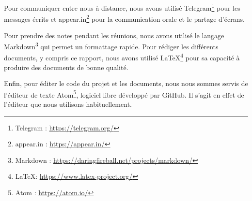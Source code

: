 Pour communiquer entre nous à distance, nous avons utilisé Telegram\footnote{Telegram : \url{https://telegram.org/}} pour les messages écrits et appear.in\footnote{appear.in : \url{https://appear.in/}} pour la communication orale et le partage d'écrans.

Pour prendre des notes pendant les réunions, nous avons utilisé le langage Markdown\footnote{Markdown : \url{https://daringfireball.net/projects/markdown/}} qui permet un formattage rapide. Pour rédiger les différents documents, y compris ce rapport, nous avons utilisé \LaTeX\footnote{\LaTeX : \url{https://www.latex-project.org/}} pour sa capacité à produire des documents de bonne qualité.

Enfin, pour éditer le code du projet et les documents, nous nous sommes servis de l'éditeur de texte Atom\footnote{Atom : \url{https://atom.io/}}, logiciel libre développé par GitHub. Il s'agit en effet de l'éditeur que nous utilisons habituellement.
